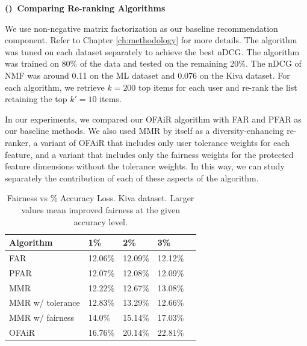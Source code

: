 
\vspace{0.25cm}
\noindent \textbf{()~Comparing Re-ranking Algorithms}
\vspace{0.25cm}

We use non-negative matrix factorization as our baseline recommendation component. Refer to Chapter \ref{ch:methodology} for more details. The algorithm was tuned on each dataset separately to achieve the best nDCG. The algorithm was trained on 80\% of the data and tested on the remaining 20\%. The nDCG of NMF was around 0.11 on the ML dataset and 0.076 on the Kiva dataset.
For each algorithm, we retrieve $k=200$ top items for each user and re-rank the list retaining the top $k'=10$ items.  

In our experiments, we compared our OFAiR algorithm with FAR and PFAR as our baseline methods. We also used MMR by itself as a diversity-enhancing re-ranker, a variant of OFAiR that includes only user tolerance weights for each feature, and a variant that includes only the fairness weights for the protected feature dimensions without the tolerance weights. In this way, we can study separately the contribution of each of these aspects of the algorithm.

\vspace{0.25cm}
\begin{table}[]
\centering
\begin{tabular}{lllll}
 Algorithm &  1\% & 2\% & 3\% \\
 \hline
 FAR & 12.06\% & 12.09\% & 12.12\% \\
 PFAR & 12.07\% & 12.08\% & 12.09\% \\
 MMR &  12.22\% & 12.67\% & 13.08\% \\
 MMR w/ tolerance & 12.83\% & 13.29\% & 12.66\%   \\
 MMR w/ fairness & 14.0\% & 15.14\% & 17.03\%  \\
 OFAiR & 16.76\% & 20.14\% & 22.81\% \\
 \hline
\end{tabular}
\caption{Fairness vs \% Accuracy Loss. Kiva dataset. 
Larger values mean improved fairness at the given accuracy level.}
\label{tbl:kiva_fairness_accuracy_relationship}
\end{table}

